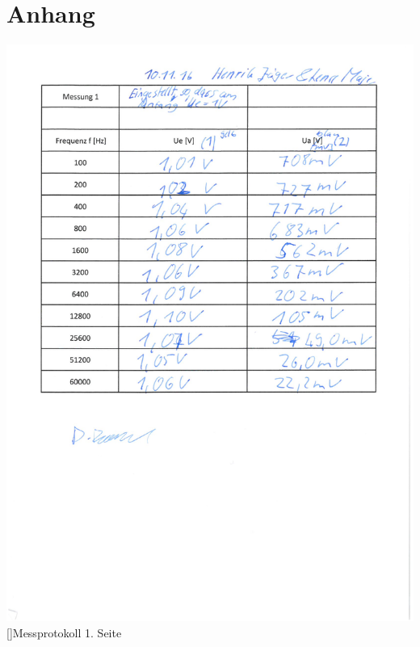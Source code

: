 \chapter{Anhang}
	\begin{center}
		\includegraphics[scale=0.65]{Protokoll/1.jpg}
        []{Messprotokoll 1. Seite}
    	\pagebreak

\end{center}
